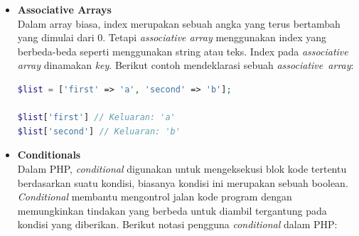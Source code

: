 \documentclass[a4paper,twoside]{article}
\begin{document}
\begin{enumerate}
\begin{itemize}
		      \item \textbf{Associative Arrays} \\ %
		            Dalam array biasa, index merupakan sebuah angka yang terus bertambah yang dimulai dari 0. Tetapi \textit{associative array} menggunakan index yang berbeda-beda seperti menggunakan string atau teks. Index pada \textit{associative array} dinamakan \textit{key}. Berikut contoh mendeklarasi sebuah \textit{associative~array}:

		            \begin{lstlisting}[language={php}, caption={Contoh mendeklarasi associative array}, label={kode:5:aarrayex}]
$list = ['first' => 'a', 'second' => 'b'];

$list['first'] // Keluaran: 'a'
$list['second'] // Keluaran: 'b'
					\end{lstlisting}

		      \item \textbf{Conditionals} \\ %
		            Dalam PHP, \textit{conditional} digunakan untuk mengeksekusi blok kode tertentu berdasarkan suatu kondisi, biasanya kondisi ini merupakan sebuah boolean. \textit{Conditional} membantu mengontrol jalan kode program dengan memungkinkan tindakan yang berbeda untuk diambil tergantung pada kondisi yang diberikan. Berikut notasi pengguna \textit{conditional} dalam PHP:


\end{itemize}
\end{enumerate}
\end{document}
